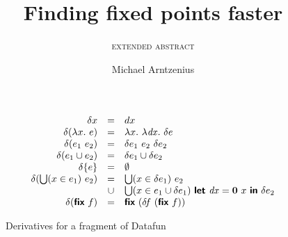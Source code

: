 \documentclass[sigplan,screen,review,timestamp]{acmart}
\title{Finding fixed points faster}
\subtitle{\sffamily\scshape extended abstract}
\author{Michael Arntzenius}
\affiliation{University of Birmingham}
\begin{document}

\maketitle

\renewcommand{\d}{\delta}
\newcommand{\dzero}{\mathbf{0}~} %
\newcommand{\fn}{\lambda}
\newcommand{\binder}{.~}
\newcommand{\bind}[1]{#1\binder}
\newcommand{\fnof}[1]{\fn\bind{#1}}

\newcommand{\kw}[1]{\textsf{\bfseries#1}}
\newcommand{\ebiglub}[1]{\bigcup(#1)~}
\newcommand{\elet}[1]{\kw{let}~#1~\kw{in}~}
\newcommand{\subst}[1]{\,[#1]}
\newcommand{\efix}{\kw{fix}~}
\newcommand{\tlv}[1]{\textrm{#1}}
\newcommand{\var}[1]{\mathit{#1}}
\newcommand{\dee}[1]{\var{d#1}}

\begin{figure}
  \[\begin{array}{rcl}
    \d x &=& dx\\
    \d(\fnof x e) &=& \fnof x \fnof{\dee x} \d{e}\\
    \d(e_1~e_2) &=& \d{e_1}~e_2~\d{e_2}\\
    \d(e_1 \cup e_2) &=& \d{e_1} \cup \d{e_2}\\
    \d{\{e\}} &=& \emptyset\\
    \d(\ebiglub{x \in e_1} e_2)
    &=& \ebiglub{x \in \d{e_1}} e_2\\
    &\cup& \ebiglub{x \in e_1 \cup \d{e_1}}
    \elet{\dee x = \dzero x}
    \d{e_2}
    \\
    \d(\efix f) &=& \efix (\d\!f~(\efix f))
  \end{array}\]
  \caption{Derivatives for a fragment of Datafun}
  \label{fig:derivs}
\end{figure}
\end{document}
